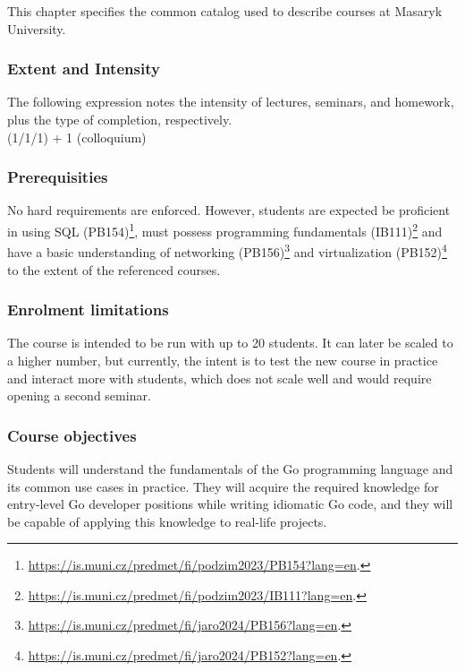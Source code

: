 \documentclass[
  digital,
  color,
  oneside,
  nosansbold,
  nocolorbold,
  nolof,
  nolot,
]{fithesis4}
\begin{document}
This chapter specifies the common catalog used to describe courses at Masaryk University.

\subsubsection{Extent and Intensity}

The following expression notes the intensity of lectures, seminars, and homework, plus the type of completion, respectively. \\

\noindent
(1/1/1) + 1 (colloquium)

\subsubsection{Prerequisities}

No hard requirements are enforced. However, students are expected be proficient in using SQL (PB154)\footnote{ \url{https://is.muni.cz/predmet/fi/podzim2023/PB154?lang=en}.}, must possess programming fundamentals (IB111)\footnote{ \url{https://is.muni.cz/predmet/fi/podzim2023/IB111?lang=en}.} and have a basic understanding of networking (PB156)\footnote{\url{https://is.muni.cz/predmet/fi/jaro2024/PB156?lang=en}.} and virtualization (PB152)\footnote{\url{https://is.muni.cz/predmet/fi/jaro2024/PB152?lang=en}.} to the extent of the referenced courses.

\subsubsection{Enrolment limitations}

The course is intended to be run with up to 20 students. It can later be scaled to a higher number, but currently, the intent is to test the new course in practice and interact more with students, which does not scale well and would require opening a second seminar.

\subsubsection{Course objectives}

Students will understand the fundamentals of the Go programming language and its common use cases in practice. They will acquire the required knowledge for entry-level Go developer positions while writing idiomatic Go code, and they will be capable of applying this knowledge to real-life projects.
\end{document}
